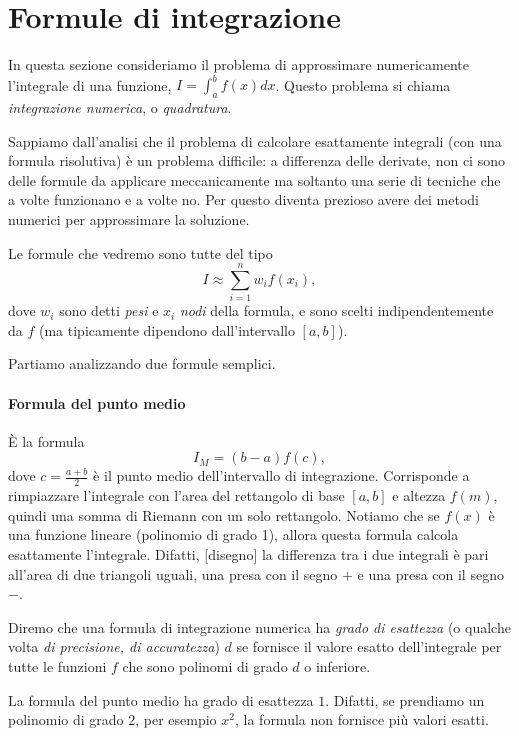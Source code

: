 \documentclass[a4paper]{report}
\theoremstyle{definiton}
\theoremstyle{remark}
\begin{document}
\section{Formule di integrazione}

In questa sezione consideriamo il problema di approssimare numericamente l'integrale di una funzione, $I = \int_a^b f(x) dx$. Questo problema si chiama \emph{integrazione numerica}, o \emph{quadratura}.

Sappiamo dall'analisi che il problema di calcolare esattamente integrali (con una formula risolutiva) è un problema difficile: a differenza delle derivate, non ci sono delle formule da applicare meccanicamente ma soltanto una serie di tecniche che a volte funzionano e a volte no. Per questo diventa prezioso avere dei metodi numerici per approssimare la soluzione.

Le formule che vedremo sono tutte del tipo
\[
I \approx \sum_{i=1}^n w_i f(x_i),
\]
dove $w_i$ sono detti \emph{pesi} e $x_i$ \emph{nodi} della formula, e sono scelti indipendentemente da $f$ (ma tipicamente dipendono dall'intervallo $[a,b]$).


Partiamo analizzando due formule semplici.

\paragraph{Formula del punto medio}
È la formula
\[
I_M = (b-a)f(c),
\]
dove $c=\frac{a+b}{2}$ è il punto medio dell'intervallo di integrazione. Corrisponde a rimpiazzare l'integrale con l'area del rettangolo di base $[a,b]$ e altezza $f(m)$, quindi una somma di Riemann con un solo rettangolo. Notiamo che se $f(x)$ è una funzione lineare (polinomio di grado 1), allora questa formula calcola esattamente l'integrale. Difatti, [disegno] la differenza tra i due integrali è pari all'area di due triangoli uguali, una presa con il segno $+$ e una presa con il segno $-$.

Diremo che una formula di integrazione numerica ha \emph{grado di esattezza} (o qualche volta \emph{di precisione, di accuratezza}) $d$ se fornisce il valore esatto dell'integrale per tutte le funzioni $f$ che sono polinomi di grado $d$ o inferiore.

La formula del punto medio ha grado di esattezza $1$. Difatti, se prendiamo un polinomio di grado $2$, per esempio $x^2$, la formula non fornisce più valori esatti.
\end{document}

